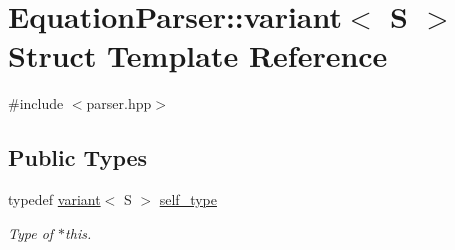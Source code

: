\hypertarget{structEquationParser_1_1variant}{}\section{Equation\+Parser\+:\+:variant$<$ S $>$ Struct Template Reference}
\label{structEquationParser_1_1variant}


{\ttfamily \#include $<$parser.\+hpp$>$}

\subsection*{Public Types}
\begin{DoxyCompactItemize}
\item 
typedef \hyperlink{structEquationParser_1_1variant}{variant}$<$ S $>$ \hyperlink{structEquationParser_1_1variant_aa17a8f334ad949693cf8f6a8197092df}{self\+\_\+type}\hypertarget{structEquationParser_1_1variant_aa17a8f334ad949693cf8f6a8197092df}{}\label{structEquationParser_1_1variant_aa17a8f334ad949693cf8f6a8197092df}

\begin{DoxyCompactList}\small\item\em Type of $\ast$this. \end{DoxyCompactList}\end{DoxyCompactItemize}
